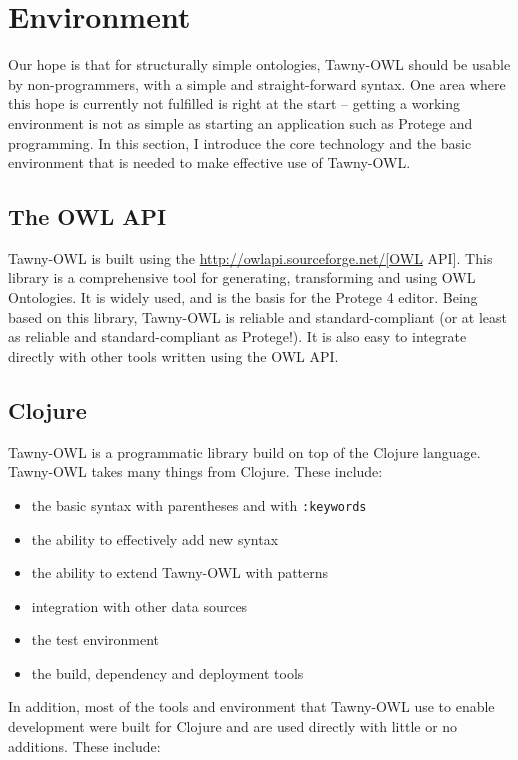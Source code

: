 \section{Environment}
\label{sec-3}

Our hope is that for structurally simple ontologies, Tawny-OWL should be
usable by non-programmers, with a simple and straight-forward syntax.
One area where this hope is currently not fulfilled is right at the
start -- getting a working environment is not as simple as starting an
application such as Protege and programming. In this section, I
introduce the core technology and the basic environment that is needed
to make effective use of Tawny-OWL.


\subsection{The OWL API}
\label{sec-3-1}

Tawny-OWL is built using the \url{http://owlapi.sourceforge.net/[OWL} API].
This library is a comprehensive tool for generating, transforming and
using OWL Ontologies. It is widely used, and is the basis for the
Protege 4 editor. Being based on this library, Tawny-OWL is reliable and
standard-compliant (or at least as reliable and standard-compliant as
Protege!). It is also easy to integrate directly with other tools
written using the OWL API.

\subsection{Clojure}
\label{sec-3-2}

Tawny-OWL is a programmatic library build on top of the Clojure
language. Tawny-OWL takes many things from Clojure. These include:

\begin{itemize}
\item the basic syntax with parentheses and with \texttt{:keywords}
\item the ability to effectively add new syntax
\item the ability to extend Tawny-OWL with patterns
\item integration with other data sources
\item the test environment
\item the build, dependency and deployment tools
\end{itemize}

In addition, most of the tools and environment that Tawny-OWL use to
enable development were built for Clojure and are used directly with
little or no additions. These include:

